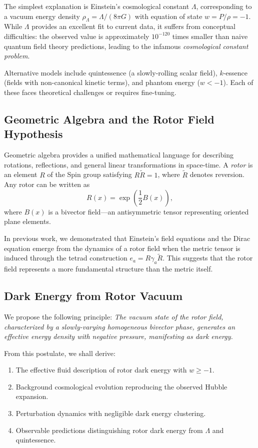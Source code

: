 \documentclass[11pt,a4paper]{article}
\numberwithin{equation}{section}
\theoremstyle{plain}
\theoremstyle{definition}
\theoremstyle{remark}
\begin{document}
The simplest explanation is Einstein's cosmological constant $\Lambda$, corresponding to a vacuum energy density $\rho_\Lambda = \Lambda/(8\pi G)$ with equation of state $w = P/\rho = -1$. While $\Lambda$ provides an excellent fit to current data, it suffers from conceptual difficulties: the observed value is approximately $10^{-120}$ times smaller than naive quantum field theory predictions, leading to the infamous \emph{cosmological constant problem}.

Alternative models include quintessence (a slowly-rolling scalar field), $k$-essence (fields with non-canonical kinetic terms), and phantom energy ($w < -1$). Each of these faces theoretical challenges or requires fine-tuning.

\subsection{Geometric Algebra and the Rotor Field Hypothesis}

Geometric algebra provides a unified mathematical language for describing rotations, reflections, and general linear transformations in space-time. A \emph{rotor} is an element $R$ of the Spin group satisfying $R\widetilde{R} = 1$, where $\widetilde{R}$ denotes reversion. Any rotor can be written as
\begin{equation}
R(x) = \exp\left(\frac{1}{2}B(x)\right),
\end{equation}
where $B(x)$ is a bivector field---an antisymmetric tensor representing oriented plane elements.

In previous work, we demonstrated that Einstein's field equations and the Dirac equation emerge from the dynamics of a rotor field when the metric tensor is induced through the tetrad construction $e_a = R\gamma_a\widetilde{R}$. This suggests that the rotor field represents a more fundamental structure than the metric itself.

\subsection{Dark Energy from Rotor Vacuum}

We propose the following principle: \emph{The vacuum state of the rotor field, characterized by a slowly-varying homogeneous bivector phase, generates an effective energy density with negative pressure, manifesting as dark energy.}

From this postulate, we shall derive:

\begin{enumerate}
  \item The effective fluid description of rotor dark energy with $w \geq -1$.
  \item Background cosmological evolution reproducing the observed Hubble expansion.
  \item Perturbation dynamics with negligible dark energy clustering.
  \item Observable predictions distinguishing rotor dark energy from $\Lambda$ and quintessence.
\end{enumerate}
\end{document}
